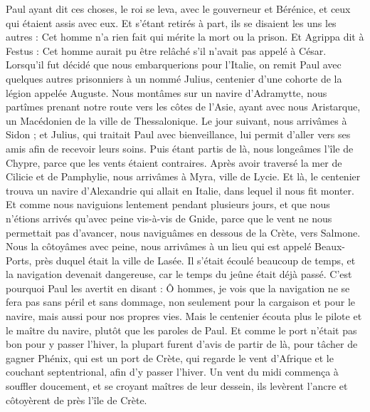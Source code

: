 \begin{multicols}{2}
Paul ayant dit ces choses, le roi se leva, avec le gouverneur et Bérénice, et ceux qui étaient assis avec eux.
Et s’étant retirés à part, ils se disaient les uns les autres : Cet homme n'a rien fait qui mérite la mort ou la prison.
Et Agrippa dit à Festus : Cet homme aurait pu être relâché s'il n'avait pas appelé à César.
\VerseOne{}Lorsqu’il fut décidé que nous embarquerions pour l’Italie, on remit Paul avec quelques autres prisonniers à un nommé Julius, centenier d'une cohorte de la légion appelée Auguste.
Nous montâmes sur un navire d'Adramytte, nous partîmes prenant notre route vers les côtes de l'Asie, ayant avec nous Aristarque, un Macédonien de la ville de Thessalonique.
Le jour suivant, nous arrivâmes à Sidon ; et Julius, qui traitait Paul avec bienveillance, lui permit d'aller vers ses amis afin de recevoir leurs soins.
Puis étant partis de là, nous longeâmes l’île de Chypre, parce que les vents étaient contraires.
Après avoir traversé la mer de Cilicie et de Pamphylie, nous arrivâmes à Myra, ville de Lycie.
Et là, le centenier trouva un navire d'Alexandrie qui allait en Italie, dans lequel il nous fit monter.
Et comme nous naviguions lentement pendant plusieurs jours, et que nous n'étions arrivés qu'avec peine vis-à-vis de Gnide, parce que le vent ne nous permettait pas d'avancer, nous naviguâmes en dessous de la Crète, vers Salmone.
Nous la côtoyâmes avec peine, nous arrivâmes à un lieu qui est appelé Beaux-Ports, près duquel était la ville de Lasée.
Il s’était écoulé beaucoup de temps, et la navigation devenait dangereuse, car le temps du jeûne était déjà passé.
C’est pourquoi Paul les avertit en disant : Ô hommes, je vois que la navigation ne se fera pas sans péril et sans dommage, non seulement pour la cargaison et pour le navire, mais aussi pour nos propres vies.
Mais le centenier écouta plus le pilote et le maître du navire, plutôt que les paroles de Paul.
Et comme le port n'était pas bon pour y passer l'hiver, la plupart furent d'avis de partir de là, pour tâcher de gagner Phénix, qui est un port de Crète, qui regarde le vent d’Afrique et le couchant septentrional, afin d’y passer l'hiver.
Un vent du midi commença à souffler doucement, et se croyant maîtres de leur dessein, ils levèrent l’ancre et côtoyèrent de près l’île de Crète.

\end{multicols}
